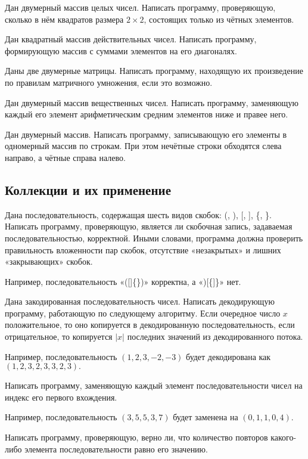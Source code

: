 \task Дан двумерный массив целых чисел. Написать программу,
проверяющую, сколько в нём квадратов размера $2\times 2$, состоящих
только из чётных элементов.

\task Дан квадратный массив действительных чисел. Написать программу,
формирующую массив с суммами элементов на его диагоналях.

\task Даны две двумерные матрицы. Написать программу, находящую их
произведение по правилам матричного умножения, если это возможно.

\task Дан двумерный массив вещественных чисел. Написать программу,
заменяющую каждый его элемент арифметическим средним элементов ниже и
правее него.

\task Дан двумерный массив. Написать программу, записывающую его
элементы в одномерный массив по строкам. При этом нечётные строки
обходятся слева направо, а чётные справа налево.

\subsection{Коллекции и их применение}

\task Дана последовательность, содержащая шесть видов скобок: (, ), [,
], \{, \}. Написать программу, проверяющую, является ли скобочная
запись, задаваемая последовательностью,
корректной. Иными словами, программа должна проверить правильность
вложенности пар скобок, отсутствие «незакрытых» и лишних «закрывающих»
скобок.

Например, последовательность «([]\{\})» корректна, а «)[\{]\}» нет.

\task Дана закодированная последовательность чисел. Написать
декодирующую программу, работающую по следующему алгоритму. Если
очередное число $x$ положительное, то оно копируется в декодированную
последовательность, если отрицательное, то копируется $|x|$ последних
значений из декодированного потока.

Например, последовательность $(1, 2, 3, -2, -3)$ будет декодирована как
$(1, 2, 3, 2, 3, 3, 2, 3).$

\task Написать программу, заменяющую каждый элемент последовательности
чисел на индекс его первого вхождения.

Например, последовательность $(3, 5, 5, 3, 7)$ будет заменена на
$(0, 1, 1, 0, 4).$

\task Написать программу, проверяющую, верно ли, что количество
повторов какого-либо элемента последовательности равно его значению.

